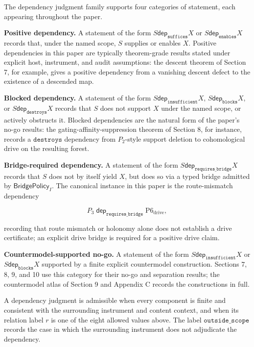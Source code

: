 \documentclass[11pt]{article}
\theoremstyle{definition}
\begin{document}
The dependency judgment family supports four categories of statement, each appearing throughout the paper.

\textbf{Positive dependency.} A statement of the form \(S\mathrel{\mathsf{dep}_{\texttt{suffices}}}X\) or \(S\mathrel{\mathsf{dep}_{\texttt{enables}}}X\) records that, under the named scope, \(S\) supplies or enables \(X\). Positive dependencies in this paper are typically theorem-grade results stated under explicit host, instrument, and audit assumptions: the descent theorem of Section 7, for example, gives a positive dependency from a vanishing descent defect to the existence of a descended map.

\textbf{Blocked dependency.} A statement of the form \(S\mathrel{\mathsf{dep}_{\texttt{insufficient}}}X\), \(S\mathrel{\mathsf{dep}_{\texttt{blocks}}}X\), or \(S\mathrel{\mathsf{dep}_{\texttt{destroys}}}X\) records that \(S\) does not support \(X\) under the named scope, or actively obstructs it. Blocked dependencies are the natural form of the paper's no-go results: the gating-affinity-suppression theorem of Section 8, for instance, records a \(\texttt{destroys}\) dependency from \(P_2\)-style support deletion to cohomological drive on the resulting forest.

\textbf{Bridge-required dependency.} A statement of the form \(S\mathrel{\mathsf{dep}_{\texttt{requires\_bridge}}}X\) records that \(S\) does not by itself yield \(X\), but does so via a typed bridge admitted by \(\mathsf{BridgePolicy}_I\). The canonical instance in this paper is the route-mismatch dependency

\[
P_3\;\mathrel{\mathsf{dep}_{\texttt{requires\_bridge}}}\;\mathrm{P6}_{\mathrm{drive}},
\]

recording that route mismatch or holonomy alone does not establish a drive certificate; an explicit drive bridge is required for a positive drive claim.

\textbf{Countermodel-supported no-go.} A statement of the form \(S\mathrel{\mathsf{dep}_{\texttt{insufficient}}}X\) or \(S\mathrel{\mathsf{dep}_{\texttt{blocks}}}X\) supported by a finite explicit countermodel construction. Sections 7, 8, 9, and 10 use this category for their no-go and separation results; the countermodel atlas of Section 9 and Appendix C records the constructions in full.

A dependency judgment is admissible when every component is finite and consistent with the surrounding instrument and content context, and when its relation label \(r\) is one of the eight allowed values above. The label \(\texttt{outside\_scope}\) records the case in which the surrounding instrument does not adjudicate the dependency.
\end{document}
